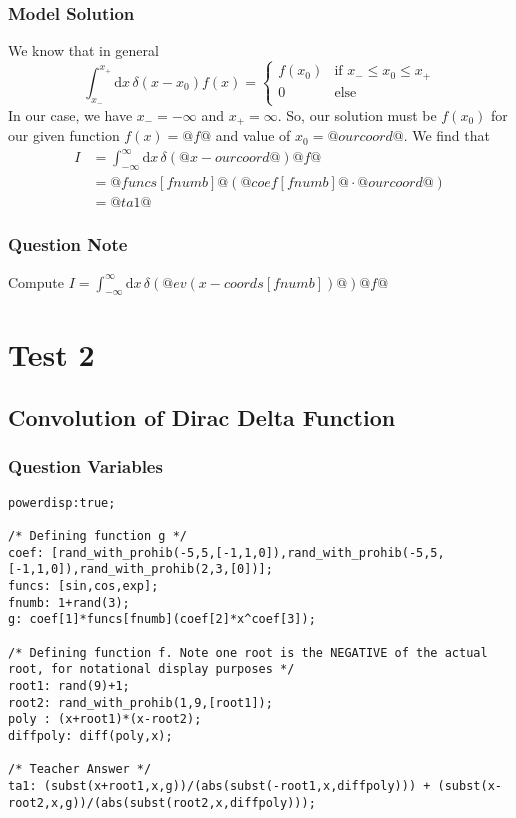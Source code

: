 \documentclass[a4paper,10pt]{article}
\begin{document}
\subsubsection{Model Solution}
We know that in general \[ \int_{x_{-}}^{x_{+}} \text{d}x \, \delta\left(x-x_0\right)f(x) = \begin{cases} f(x_0) & \text{if } x_{-}\leq x_{0} \leq x_{+} \\ 0 & \text{else} \\ \end{cases} \] In our case, we have \(x_{-}=-\infty\) and \(x_{+}=\infty\). So, our solution must be \(f(x_0)\) for our given function \(f(x)=@f@\) and value of \(x_0=@ourcoord@\). We find that \begin{align*} I &= \int_{-\infty}^{\infty} \text{d}x \, \delta\left(@x-ourcoord@\right)@f@ \\ &= @funcs[fnumb]@\left(@coef[fnumb]@\cdot@ourcoord@\right) \\ &= @ta1 @\end{align*}
\subsubsection{Question Note}
Compute \(I = \int_{-\infty}^{\infty} \text{d}x \, \delta\left(@ev(x-coords[fnumb])@\right)@f@\)

\section{Test 2}
\subsection{Convolution of Dirac Delta Function}
\subsubsection{Question Variables}
\begin{lstlisting}
powerdisp:true;

/* Defining function g */
coef: [rand_with_prohib(-5,5,[-1,1,0]),rand_with_prohib(-5,5,[-1,1,0]),rand_with_prohib(2,3,[0])];
funcs: [sin,cos,exp];
fnumb: 1+rand(3);
g: coef[1]*funcs[fnumb](coef[2]*x^coef[3]);

/* Defining function f. Note one root is the NEGATIVE of the actual root, for notational display purposes */
root1: rand(9)+1;
root2: rand_with_prohib(1,9,[root1]);
poly : (x+root1)*(x-root2);
diffpoly: diff(poly,x);

/* Teacher Answer */
ta1: (subst(x+root1,x,g))/(abs(subst(-root1,x,diffpoly))) + (subst(x-root2,x,g))/(abs(subst(root2,x,diffpoly)));
\end{lstlisting}
\end{document}
